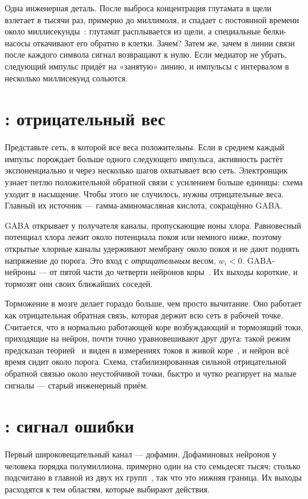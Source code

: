 Одна инженерная деталь. После выброса концентрация глутамата в щели взлетает в тысячи раз, примерно до миллимоля, и спадает с постоянной времени около миллисекунды~\cite{Clements1992}: глутамат расплывается из щели, а специальные белки-насосы откачивают его обратно в клетки. Зачем? Затем же, зачем в линии связи после каждого символа сигнал возвращают к нулю. Если медиатор не убрать, следующий импульс придёт на «занятую» линию, и импульсы с интервалом в несколько миллисекунд сольются.

\section{: отрицательный вес}

Представьте сеть, в которой все веса положительны. Если в среднем каждый импульс порождает больше одного следующего импульса, активность растёт экспоненциально и через несколько шагов охватывает всю сеть. Электронщик узнает петлю положительной обратной связи с усилением больше единицы: схема уходит в насыщение. Чтобы этого не случилось, нужны отрицательные веса. Главный их источник --- гамма-аминомасляная кислота, сокращённо GABA.

GABA открывает у получателя каналы, пропускающие ионы хлора. Равновесный потенциал хлора лежит около потенциала покоя или немного ниже, поэтому открытые хлорные каналы удерживают мембрану около покоя и не дают поднять напряжение до порога. Это вход с \emph{отрицательным} весом, $w_i<0$. GABA-нейроны --- от пятой части до четверти нейронов коры~\cite{Hendry1987}. Их выходы короткие, и тормозят они своих ближайших соседей.

Торможение в мозге делает гораздо больше, чем просто вычитание. Оно работает как отрицательная обратная связь, которая держит всю сеть в рабочей точке. Считается, что в нормально работающей коре возбуждающий и тормозящий токи, приходящие на нейрон, почти точно уравновешивают друг друга: такой режим предсказан теорией~\cite{vanVreeswijk1996} и виден в измерениях токов в живой коре~\cite{Haider2006}, и нейрон всё время сидит около порога. Схема, стабилизированная сильной отрицательной обратной связью около неустойчивой точки, быстро и чутко реагирует на малые сигналы --- старый инженерный приём.

\section{: сигнал ошибки}

Первый широковещательный канал --- дофамин. Дофаминовых нейронов у человека порядка полумиллиона, примерно один на сто семьдесят тысяч; столько подсчитано в главной из двух их групп~\cite{Pakkenberg1991}, так что это нижняя граница. Их выходы расходятся к тем областям, которые выбирают действия.

